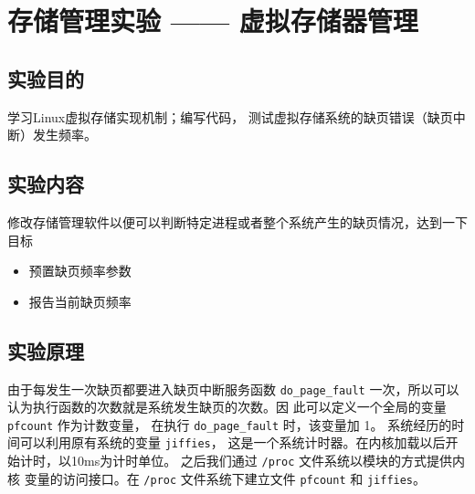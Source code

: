 \documentclass[blue,normal,cn]{elegantnote}
\newcommand{\code}[1]{\colorbox{light-gray}{\texttt{#1}}}
\begin{document}
\section{存储管理实验 —— 虚拟存储器管理}
\subsection{实验目的}
学习Linux虚拟存储实现机制；编写代码，
测试虚拟存储系统的缺页错误（缺页中断）发生频率。
\subsection{实验内容}
修改存储管理软件以便可以判断特定进程或者整个系统产生的缺页情况，达到一下目标
\begin{itemize}
  \item 预置缺页频率参数
  \item 报告当前缺页频率
\end{itemize}
\subsection{实验原理}
由于每发生一次缺页都要进入缺页中断服务函数 \code{do\_page\_fault}
一次，所以可以认为执行函数的次数就是系统发生缺页的次数。因
此可以定义一个全局的变量 \code{pfcount} 作为计数变量，
在执行 \code{do\_page\_fault} 时，该变量加 1。
系统经历的时间可以利用原有系统的变量 \code{jiffies}，
这是一个系统计时器。在内核加载以后开始计时，以10ms为计时单位。
之后我们通过 \code{/proc} 文件系统以模块的方式提供内核
变量的访问接口。在 \code{/proc} 文件系统下建立文件 \code{pfcount} 和 \code{jiffies}。
\end{document}
